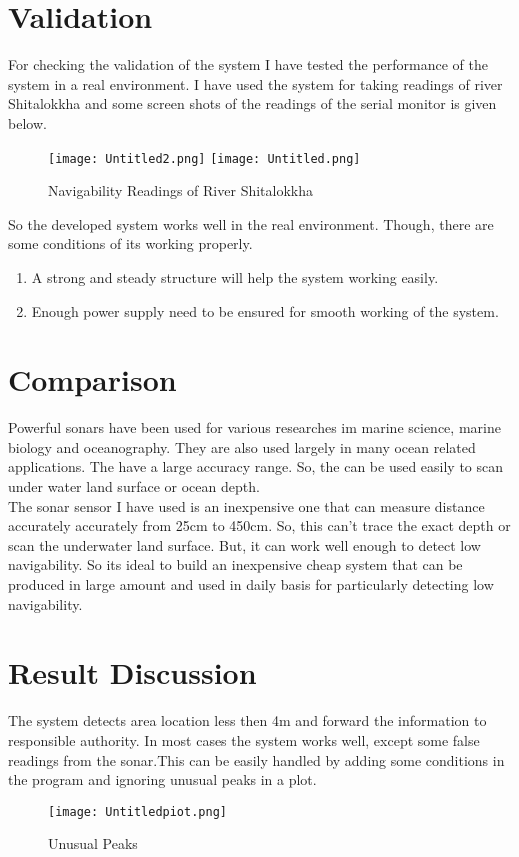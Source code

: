 \documentclass[12pt, top = 1 inch, bottom = 1 inch, left = 1.2 inch, top = .8 inch]{book}
\begin{document}
		\section{Validation}
		For checking the validation of the system I have tested the performance of the system in a real environment. I have used the system for taking readings of river Shitalokkha and some screen shots of the readings of the serial monitor is given below.
		\begin{figure}[h!]	
			\centering
			\texttt{[image: Untitled2.png]}
			\texttt{[image: Untitled.png]}
			\caption{Navigability Readings of River Shitalokkha}
		\end{figure} 
		So the developed system works well in the real environment. Though, there are some conditions of its working properly.
		\begin{enumerate}
			\item A strong and steady structure will help the system working easily.
			\item Enough power supply need to be ensured for smooth working of the system.
		\end{enumerate}
		\section{Comparison}
		Powerful sonars have been used for various researches im marine science, marine biology and oceanography. They are also used largely in many ocean related applications. The have a large accuracy range. So, the can be used easily to scan under water land surface or ocean depth. \\
		The sonar sensor I have used is an inexpensive one that can measure distance accurately accurately from 25cm to 450cm. So, this can't trace the exact depth or scan the underwater land surface. But, it can work well enough to detect low navigability. So its ideal to build an inexpensive cheap system that can be produced in large amount and used in daily basis for particularly detecting low navigability.
		\section{Result Discussion}
		The system detects area location less then 4m and forward the information to responsible authority. In most cases the system works well, except some false readings from the sonar.This can be easily handled by adding some conditions in the program and ignoring unusual peaks in a plot.
		\begin{figure}[h!]	
			\centering
			\texttt{[image: Untitledpiot.png]}
			\caption{Unusual Peaks}
		\end{figure} 
\end{document}
